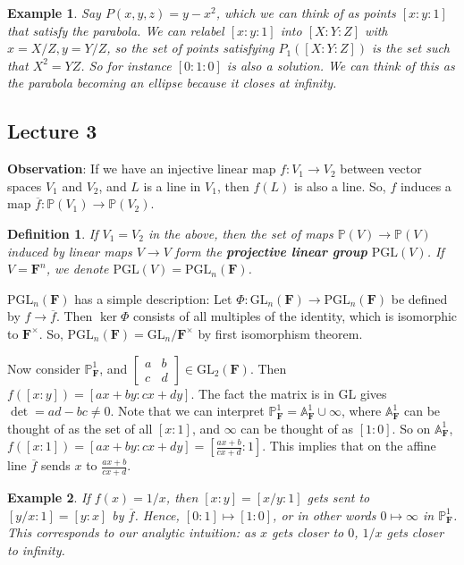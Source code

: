 \documentclass[12pt]{article}
\newcommand{\F}{\mathbf{F}}
\renewcommand{\P}{\mathbb{P}}
\newcommand{\GL}{\mathrm{GL}}
\newcommand{\A}{\mathbb{A}}
\newcommand{\PGL}{\mathrm{PGL}}
\newtheorem{definition}{Definition}[section]
\newtheorem*{example}{Example}
\begin{document}
    \begin{example}
        Say $P(x, y, z) = y - x^2$, which we can think of as points $[x:y:1]$ that satisfy the parabola. We can relabel $[x:y:1]$ into $[X:Y:Z]$ with $x = X/Z, y = Y/Z$, so the set of points satisfying $P_1([X:Y:Z])$ is the set such that $X^2 = YZ$. So for instance $[0:1:0]$ is also a solution. We can think of this as the parabola becoming an ellipse because it closes at infinity. 
    \end{example}

    \subsection{Lecture 3}
    \textbf{Observation}: If we have an injective linear map $f: V_1 \to V_2$ between vector spaces $V_1$ and $V_2$, and $L$ is a line in $V_1$, then $f(L)$ is also a line. So, $f$ induces a map $\overline{f}: \P(V_1) \to \P(V_2)$.
    \begin{definition}
        If $V_1 = V_2$ in the above, then the set of maps $\P(V) \to \P(V)$ induced by linear maps $V \to V$ form the \textbf{projective linear group} $\PGL(V)$. If $V = \F^n$, we denote $\PGL(V) = \PGL_n(\F)$. 
    \end{definition}
    $\PGL_n(\F)$ has a simple description: Let $\Phi: \GL_n(\F) \to \PGL_n(\F)$ be defined by $f \to \overline{f}$. Then $\ker \Phi$ consists of all multiples of the identity, which is isomorphic to $\F^\times$. So, $\PGL_n(\F) = \GL_n/\F^\times$ by first isomorphism theorem. \par
    Now consider $\P_\F^1$, and $\begin{bmatrix}
        a & b \\ c & d
    \end{bmatrix} \in \GL_2(\F)$. Then $f([x: y]) = [ax+by: cx+dy]$. The fact the matrix is in $\GL$ gives $\det = ad - bc \neq 0$. Note that we can interpret $\P_\F^1 = \A_\F^1 \cup \infty$, where $\A_\F^1$ can be thought of as the set of all $[x:1]$, and $\infty$ can be thought of as $[1:0]$. So on $\A_\F^1$, $f([x: 1]) = [ax+by: cx+dy] = [\frac{ax+b}{cx+d}:1]$. This implies that on the affine line $\overline{f}$ sends $x$ to $\frac{ax+b}{cx+d}$. 
    \begin{example}
        If $f(x) = 1/x$, then $[x:y] = [x/y:1]$ gets sent to $[y/x:1] = [y:x]$ by $\overline{f}$. Hence, $[0:1] \mapsto [1:0]$, or in other words $0 \mapsto \infty$ in $\P_\F^1$. This corresponds to our analytic intuition: as $x$ gets closer to $0$, $1/x$ gets closer to infinity. 
    \end{example}
\end{document}
